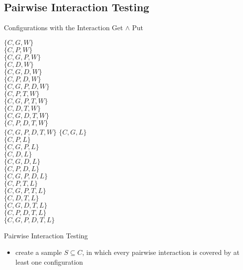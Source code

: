 \subsection{Pairwise Interaction Testing}
\begin{frame}{\myframetitle{} }
	\begin{fancycolumns}
		\begin{example}{Configurations with the Interaction Get $\wedge$ Put}
			\footnotesize
			\begin{fancycolumns}[animation=none,widths={55,45}]
				$\{C,G,W\}$\\
				$\{C,P,W\}$\\
				\emph{$\{C,G,P,W\}$}\\
				$\{C,D,W\}$\\
				$\{C,G,D,W\}$\\
				$\{C,P,D,W\}$\\
				\emph{$\{C,G,P,D,W\}$}\\
				$\{C,P,T,W\}$\\
				\emph{$\{C,G,P,T,W\}$}\\
				$\{C,D,T,W\}$\\
				$\{C,G,D,T,W\}$\\
				$\{C,P,D,T,W\}$\\
				\emph{$\{C,G,P,D,T,W\}$}
			\nextcolumn
				$\{C,G,L\}$\\
				$\{C,P,L\}$\\
				\emph{$\{C,G,P,L\}$}\\
				$\{C,D,L\}$\\
				$\{C,G,D,L\}$\\
				$\{C,P,D,L\}$\\
				\emph{$\{C,G,P,D,L\}$}\\
				$\{C,P,T,L\}$\\
				\emph{$\{C,G,P,T,L\}$}\\
				$\{C,D,T,L\}$\\
				$\{C,G,D,T,L\}$\\
				$\{C,P,D,T,L\}$\\
				\emph{$\{C,G,P,D,T,L\}$}
			\end{fancycolumns}
		\end{example}
		\pause
		\begin{definition}{Pairwise Interaction Testing}
			\begin{itemize}
				\setlength\itemsep{.5em}
				\item create a sample $S \subseteq C$, in which every pairwise interaction is covered by at least one configuration %

\end{itemize}
\end{definition}
\end{fancycolumns}
\end{frame}
